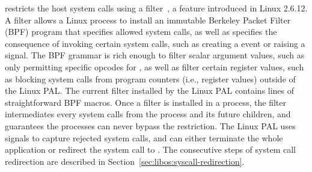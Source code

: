 \graphene{} restricts the host system calls 
using a \seccomp{} %
filter~\cite{seccomp}, a feature introduced in Linux 2.6.12.
A \seccomp{} filter allows a Linux process to install an immutable Berkeley Packet Filter (BPF) program
that specifies allowed system calls, as well as specifies
the consequence of invoking certain system calls, such as creating a  event or raising a  signal.
The BPF grammar is rich enough to filter scalar argument values,
such as only permitting specific opcodes for ,
as well as filter certain register values, such as blocking system calls from program counters (i.e.,  register values) outside of the Linux PAL.
The current \seccomp{} filter installed by the Linux PAL contains \seccomplines{} lines of straightforward BPF macros.  %
Once a \seccomp{} filter is installed in a process,
the filter intermediates
every system calls from the process and its future children, and guarantees the processes can never bypass the restriction.
The Linux PAL uses  signals to capture rejected system calls,
and can either terminate the whole application or
redirect the system call to \thelibos{}.
The consecutive steps of system call redirection are described in Section~\ref{sec:libos:syscall-redirection}.



